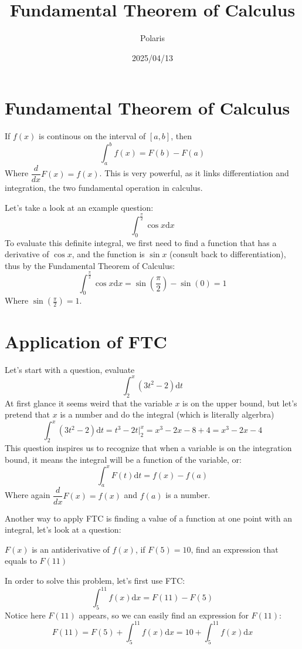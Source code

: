 \documentclass{article}
\title{Fundamental Theorem of Calculus}
\author{Polaris}
\date{2025/04/13}
\begin{document}
\maketitle

\section{Fundamental Theorem of Calculus}
If $f(x)$ is continous on the interval of $[a,b]$, then
\[
\int_{a}^{b} f(x) = F(b) - F(a)
\]
Where $\displaystyle \dfrac{d}{dx}F(x) = f(x)$. This is very powerful, as it links differentiation and integration,
the two fundamental operation in calculus.

Let's take a look at an example question:
\[
\int_{0}^{\frac{\pi}{2}} \cos x \mathrm{d}x
\]
To evaluate this definite integral, we first need to find a function that has a derivative of $\cos x$,
and the function is $\sin x$ (consult back to differentiation), thus by the Fundamental Theorem of Calculus:
\[
    \int_{0}^{\frac{\pi}{2}} \cos x \mathrm{d}x = \sin (\frac{\pi}{2}) - \sin (0) = 1
\]
Where $\displaystyle \sin(\frac{\pi}{2}) = 1$.

\section{Application of FTC}
Let's start with a question, evaluate
\[
\int_{2}^{x}(3t^2-2)\mathrm{d}t
\]
At first glance it seems weird that the variable $x$ is on the upper bound, but let's pretend that $x$ is a number
and do the integral (which is literally algerbra)
\[
\int_{2}^{x} (3t^2-2)\mathrm{d}t = t^3 - 2t \Big|_2^x = x^3 - 2x - 8 +4 = x^3 - 2x -4
\]
This question inspires us to recognize that when a variable is on the integration bound, 
it means the integral will be a function of the variable, or:
\[
\int_{a}^{x} F(t)\mathrm{d}t = f(x) - f(a)
\]
Where again $\displaystyle \dfrac{d}{dx}F(x) = f(x)$ and $f(a)$ is a number.

\newpage
Another way to apply FTC is finding a value of a function at one point with an integral,
let's look at a question:

$F(x)$ is an antiderivative of $f(x)$, if $F(5) = 10$, find an expression that equals to $F(11)$

In order to solve this problem, let's first use FTC:
\[
\int_{5}^{11}f(x)\mathrm{d}x = F(11)-F(5)
\]
Notice here $F(11)$ appears, so we can easily find an expression for $F(11)$:
\[
F(11) = F(5) + \int_{5}^{11}f(x)\mathrm{d}x = 10 + \int_{5}^{11}f(x)\mathrm{d}x
\]
\end{document}
